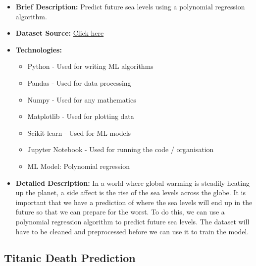 \documentclass{article}
\begin{document}
\begin{itemize}
    \item \textbf{Brief Description:} Predict future sea levels using a polynomial regression algorithm.
    \item \textbf{Dataset Source:} \href{https://www.kaggle.com/datasets/kkhandekar/global-sea-level-1993-2021}{Click here} 
    \item \textbf{Technologies:}
    \begin{itemize}
        \item Python - Used for writing ML algorithms
        \item Pandas - Used for data processing
        \item Numpy - Used for any mathematics
        \item Matplotlib - Used for plotting data
        \item Scikit-learn - Used for ML models
        \item Jupyter Notebook - Used for running the code / organisation
        \item ML Model: Polynomial regression
    \end{itemize}
    \item \textbf{Detailed Description:} In a world where global warming is steadily heating up the planet, a side affect is the rise of the sea levels across the globe. 
    It is important that we have a prediction of where the sea levels will end up in the future so that we can prepare for the worst. To do this, we can use a polynomial 
    regression algorithm to predict future sea levels. The dataset will have to be cleaned and preprocessed before we can use it to train the model.
\end{itemize}

\subsection{Titanic Death Prediction}
\end{document}
